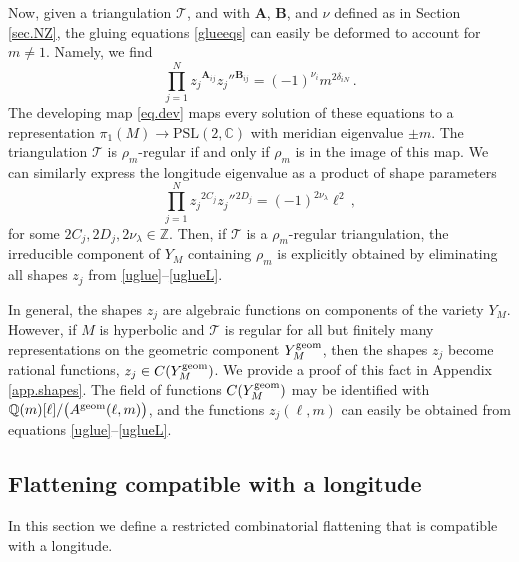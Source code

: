 \documentclass[12pt]{amsart}
\newcommand{\lbl}{\label}
\renewcommand{\eta}{\nu}
\theoremstyle{definition}
\def\BZ{\mathbb Z}
\def\BQ{\mathbb Q}
\def\BC{\mathbb C}
\def\longto{\longrightarrow}
\def\PSL{\mathrm{PSL}}
\def\be{  \begin{equation} }
\def\ee{  \end{equation} }
\newcommand{\CT}{\mathcal{T}}
\newcommand{\mb}{\mathbf}
\numberwithin{equation}{section}
\begin{document}
Now, given a triangulation $\CT$, and with $\mb A$, $\mb B$, and $\eta$ defined as in Section \ref{sec.NZ}, the gluing equations \eqref{glueeqs} can easily be deformed to account for $m\neq 1$. Namely, we find \cite{NZ}
%
\be 
\lbl{uglue} 
\prod_{j=1}^Nz_j{}^{\mb A_{ij}}z_j''{}^{\mb B_{ij}} = (-1)^{\eta_i} m^{2\delta_{iN}}\,. 
\ee
%
The developing map \eqref{eq.dev} maps every solution of these equations to a representation $\pi_1(M)\longto \PSL(2,\BC)$ with meridian eigenvalue $\pm m$. The triangulation $\CT$ is $\rho_m$-regular if and only if $\rho_m$ is in the image of this map. We can similarly express the longitude eigenvalue as a product of shape parameters
%
\be 
\lbl{uglueL} 
\prod_{j=1}^N z_j{}^{2 C_j}z_j''{}^{2D_j} = (-1)^{2\eta_\lambda}\ell^2\,,\ee
%
for some $2 C_j,2 D_j,2\eta_\lambda \in \BZ$.
Then, if $\CT$ is a $\rho_m$-regular triangulation, the irreducible component of $Y_M$ containing $\rho_m$ is explicitly obtained by eliminating all shapes $z_j$ from \eqref{uglue}--\eqref{uglueL}. 

In general, the shapes $z_j$ are algebraic functions on components of the variety $Y_M$. However, if $M$ is hyperbolic and $\CT$ is regular for all but finitely many representations on the geometric component $Y_M^{\rm geom}$, then the shapes $z_j$ become rational functions, $z_j\in C(Y_M^{\rm geom})$. We provide a proof of this fact in Appendix \ref{app.shapes}. The field of functions $C(Y_M^{\rm geom})$ may be identified with $\BQ(m)[\ell]/\big(A^{\rm geom}(\ell,m)\big)$, and the functions $z_j(\ell,m)$ can easily be obtained from equations \eqref{uglue}--\eqref{uglueL}. 





\subsection{Flattening compatible with a longitude}
\lbl{sec.uflat}

In this section we define a restricted combinatorial flattening that 
is compatible with a longitude.
\end{document}
